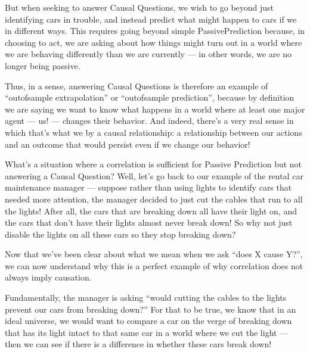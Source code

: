 \documentclass[letterpaper,10pt,english]{jupyterBook}
\begin{document}
\sphinxAtStartPar
But when seeking to answer Causal Questions, we wish to go beyond just identifying cars in trouble, and instead predict what might happen to cars if we  in different ways. This requires going beyond simple Passive\sphinxhyphen{}Prediction because, in choosing to act, we are asking about how things might turn out in a world where we are behaving differently than we are currently — in other words, we are no longer being passive.

\sphinxAtStartPar
Thus, in a sense, answering Causal Questions is therefore  an example of “out\sphinxhyphen{}of\sphinxhyphen{}sample extrapolation” or “out\sphinxhyphen{}of\sphinxhyphen{}sample prediction”, because by definition we are saying we want to know what happens in a world where at least one major agent — us! — changes their behavior. And indeed, there’s a very real sense in which that’s what we  by a causal relationship: a relationship between our actions and an outcome that would persist even if we change our behavior!

\sphinxAtStartPar
What’s a situation where a correlation is sufficient for Passive Prediction but not answering a Causal Question? Well, let’s go back to our example of the rental car maintenance manager — suppose rather than using  lights to identify cars that needed more attention, the manager decided to just cut the cables that run to all the  lights! After all, the cars that are breaking down all have their  light on, and the cars that don’t have their  lights almost never break down! So why not just disable the  lights on all these cars so they stop breaking down?

\sphinxAtStartPar
Now that we’ve been clear about what we mean when we ask “does X cause Y?”, we can now understand why this is a perfect example of why correlation does not always imply causation.

\sphinxAtStartPar
Fundamentally, the manager is asking “would cutting the cables to the  lights prevent our cars from breaking down?” For that to be true, we know that in an ideal universe, we would want to compare a car on the verge of breaking down that has its  light intact to that same car in a world where we cut the  light — then we can see if there is a difference in whether these cars break down!
\end{document}
